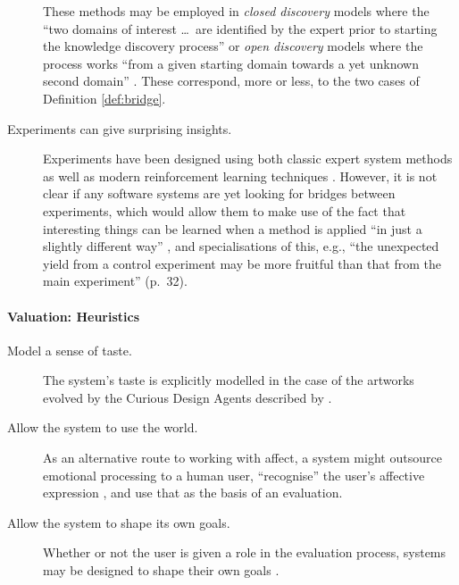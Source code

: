 \begin{description}
   These methods may be employed in
 \emph{closed discovery} models where
  the ``two domains of interest \ldots\ are identified by the expert prior to starting
the knowledge discovery process'' or
 \emph{open discovery}
   models where the process works
   ``from a given starting domain towards a yet unknown second domain''
  \cite{jurvsivc2012cross}.
  These correspond, more or less, to the two cases of Definition \ref{def:bridge}.
\item[Experiments can give surprising insights.]  Experiments have
  been designed using both classic expert system methods
  \cite{Lorenzen1992} as well as modern reinforcement learning
  techniques \cite{melnikov2018active}.  However, it is not clear if
  any software systems are yet looking for bridges between
  experiments, which would allow them to make use of the fact that
  interesting things can be learned when a method is applied ``in just
  a slightly different way'' \cite[p.~28]{austin1978chase}, and
  specialisations of this, e.g., ``the unexpected yield from a control
  experiment may be more fruitful than that from the main experiment''
  (p.~32).
\end{description}

\paragraph{\textbf{\upshape Valuation: Heuristics}} 
                                         
\begin{description}                      
\item[Model a sense of taste.] The system's taste is explicitly
  modelled in the case of the artworks evolved by the {\sf Curious
    Design Agents} described by \citet{Saunders2007}.
\item[Allow the system to use the world.] As an alternative route to
  working with affect, a system might outsource emotional processing
  to a human user, ``recognise'' the user's affective expression
  \cite[p.~15]{picard1995affective}, and use that as the basis of an
  evaluation.
\item[Allow the system to shape its own goals.] 
Whether or not the user
  is given a role in the evaluation process, systems may be designed
  to shape their own goals
  \cite{kaplan2007intrinsically,singh2010intrinsically}.
\end{description}


